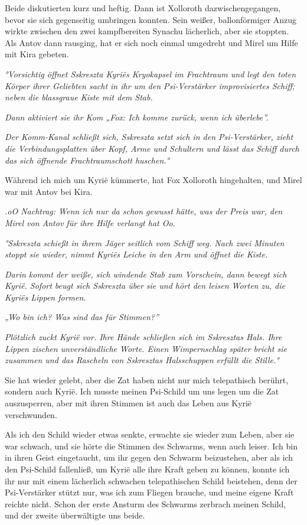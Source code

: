 \documentclass[11pt]{scrartcl}
\begin{document}
Beide diskutierten kurz und heftig. Dann ist Xolloroth
dazwischengegangen, bevor sie sich gegenseitig umbringen konnten. Sein
weißer, ballonförmiger Anzug wirkte zwischen den zwei kampfbereiten
Synachu lächerlich, aber sie stoppten. Als Antov dann rausging, hat er
sich noch einmal umgedreht und Mirel um Hilfe mit Kira gebeten.

\emph{°Vorsichtig öffnet Sskreszta Kyriës Kryokapsel im Frachtraum und
legt den toten Körper ihrer Geliebten sacht in ihr um den Psi-Verstärker
improvisiertes Schiff; neben die blassgraue Kiste mit dem Stab.}

\emph{Dann aktiviert sie ihr Kom „Fox: Ich komme zurück, wenn ich
überlebe''.}

\emph{Der Komm-Kanal schließt sich, Sskreszta setzt sich in den
Psi-Verstärker, zieht die Verbindungsplatten über Kopf, Arme und
Schultern und lässt das Schiff durch das sich öffnende Frachtraumschott
huschen.°}

Während ich mich um Kyrië kümmerte, hat Fox Xolloroth hingehalten, und
Mirel war mit Antov bei Kira.

\emph{.oO Nachtrag: Wenn ich nur da schon gewusst hätte, was der Preis
war, den Mirel von Antov für ihre Hilfe verlangt hat Oo.}

\emph{°Sskreszta schießt in ihrem Jäger seitlich vom Schiff weg. Nach
zwei Minuten stoppt sie wieder, nimmt Kyriës Leiche in den Arm und
öffnet die Kiste.}

\emph{Darin kommt der weiße, sich windende Stab zum Vorschein, dann
bewegt sich Kyrië. Sofort beugt sich Sskreszta über sie und hört den
leisen Worten zu, die Kyriës Lippen formen.}

\emph{„Wo bin ich? Was sind das für Stimmen?''}

\emph{Plötzlich zuckt Kyrië vor. Ihre Hände schließen sich im Sskresztas
Hals. Ihre Lippen zischen unverständliche Worte. Einen Wimpernschlag
später bricht sie zusammen und das Rascheln von Sskresztas Halsschuppen
erfüllt die Stille.°}

Sie hat wieder gelebt, aber die Zat haben nicht nur mich telepathisch
berührt, sondern auch Kyrië. Ich musste meinen Psi-Schild um uns legen
um die Zat auszusperren, aber mit ihren Stimmen ist auch das Leben aus
Kyrië verschwunden.

Als ich den Schild wieder etwas senkte, erwachte sie wieder zum Leben,
aber sie war schwach, und sie hörte die Stimmen des Schwarms, wenn auch
leiser. Ich bin in ihren Geist eingetaucht, um ihr gegen den Schwarm
beizustehen, aber als ich den Psi-Schild fallenließ, um Kyrië alle ihre
Kraft geben zu können, konnte ich ihr nur mit einem lächerlich schwachen
telepathischen Schild beistehen, denn der Psi-Verstärker stützt nur, was
ich zum Fliegen brauche, und meine eigene Kraft reichte nicht. Schon der
erste Ansturm des Schwarms zerbrach meinen Schild, und der zweite
überwältigte uns beide.
\end{document}
